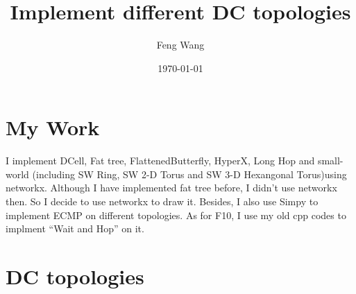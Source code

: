 \documentclass[11pt]{article}
\begin{document}
\title{Implement different DC topologies}
\author{Feng Wang}
\date{\today}
\maketitle
\section{My Work}
I implement DCell, Fat tree, FlattenedButterfly, HyperX, Long Hop and small-world (including SW Ring, SW 2-D Torus and SW 3-D Hexangonal Torus)using networkx. Although I have implemented fat tree before, I didn't use networkx then. So I decide to use networkx to draw it. Besides, I also use Simpy to implement ECMP on different topologies. As for F10, I use my old cpp codes to implment ``Wait and Hop'' on it.  
\section{DC topologies}
\end{document}
